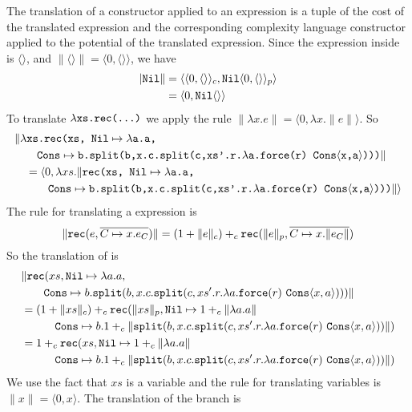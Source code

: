 The translation of a constructor applied to an expression is a tuple of the
cost of the translated expression and the corresponding complexity language
constructor applied to the potential of the translated expression. Since the
expression inside  is $\langle\rangle$, and
$\|\langle\rangle\| = \langle 0,\langle\rangle\rangle$, we have
%
\begin{align*}
  |\texttt{Nil}\| &= \langle\langle 0, \langle\rangle\rangle_c, \texttt{Nil}\langle 0,\langle\rangle\rangle_p\rangle \\
             &= \langle 0, \texttt{Nil}\langle\rangle\rangle
\end{align*}
%
To translate $\lambda\texttt{xs.rec(...)}$ we apply the rule
$\|\lambda x.e\| = \langle 0, \lambda x.\|e\|\rangle$. So
%
\begin{align*}
  &\|\lambda\texttt{xs.rec(xs, Nil}\mapsto\lambda\texttt{a.a,} \\
  &\qquad \texttt{Cons}\mapsto\texttt{b.split(b,x.c.split(c,xs'.r.}\lambda\texttt{a.force(r) Cons}\langle\texttt{x,a}\rangle\texttt{)))}\| \\
  &\quad= \langle 0, \lambda xs.\|\texttt{rec(xs, Nil}\mapsto\lambda\texttt{a.a,} \\
  &\qquad\quad \texttt{Cons}\mapsto\texttt{b.split(b,x.c.split(c,xs'.r.}\lambda\texttt{a.force(r) Cons}\langle\texttt{x,a}\rangle\texttt{)))}\|\rangle
\end{align*}
%
The rule for translating a  expression is
\[
  \|\texttt{rec}(e,\overline{C \mapsto x.e_C})\| = (1 + \|e\|_c) +_c \texttt{rec}(\|e\|_p, \overline{C \mapsto x.\|e_C\|})
\]
So the translation of  is
%
\begin{align*}
  &\|\T{rec}(xs, \T{Nil}\mapsto\lambda a.a, \\
  &\qquad \T{Cons}\mapsto b.\T{split}(b,x.c.\T{split}(c,xs'.r.\lambda a.\T{force}(r)\ \T{Cons}\langle x,a\rangle)))\| \\
  &= (1 + \|xs\|_c) +_c \T{rec}(\|xs\|_p, \T{Nil} \mapsto 1 +_c \|\lambda a.a\| \\
  &\quadthree \T{Cons}\mapsto b. 1 +_c \|\T{split}(b,x.c.\T{split}(c,xs'.r.\lambda a.\T{force}(r)\ \T{Cons}\langle x,a\rangle))\|) \\
  &= 1 +_c \T{rec}(xs, \T{Nil} \mapsto 1 +_c \|\lambda a.a\| \\
  &\quadthree \T{Cons}\mapsto b. 1 +_c \|\T{split}(b,x.c.\T{split}(c,xs'.r.\lambda a.\T{force}(r)\ \T{Cons}\langle x,a\rangle))\|)
\end{align*}
%
We use the fact that $xs$ is a variable and the rule for translating variables
is $\|x\| = \langle 0, x\rangle$. The translation of the  branch is
